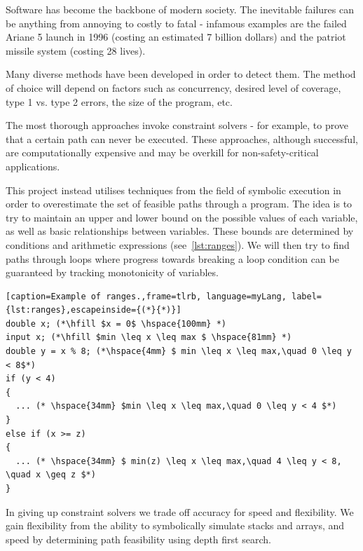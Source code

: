 \documentclass[12pt,a4paper]{article}
\begin{document}
Software has become the backbone of modern society.
The inevitable failures can be anything from annoying to costly to fatal - infamous examples are the failed Ariane 5 launch in 1996
(costing an estimated 7 billion dollars) and the patriot missile system (costing 28 lives).

Many diverse methods have been developed in order to detect them. The method of choice will depend on factors such as concurrency,
desired level of coverage, type 1 vs. type 2 errors, the size of the program, etc.

The most thorough approaches invoke constraint solvers - for example, to prove that
a certain path can never be executed. These approaches, although successful, are computationally expensive and may be overkill for non-safety-critical applications.

This project instead utilises techniques from the field of symbolic execution in order to overestimate the set of feasible paths through a program.
The idea is to try to maintain an upper and lower bound on the possible values of each variable, as well as basic relationships between variables.
These bounds are determined by conditions and arithmetic expressions (see~\cref{lst:ranges}).
We will then try to find paths through loops where progress towards breaking a loop condition can be guaranteed by tracking monotonicity of variables.

\begin{minipage}{\linewidth}
\begin{lstlisting}[caption=Example of ranges.,frame=tlrb, language=myLang, label={lst:ranges},escapeinside={(*}{*)}]
double x; (*\hfill $x = 0$ \hspace{100mm} *)
input x; (*\hfill $min \leq x \leq max $ \hspace{81mm} *)
double y = x % 8; (*\hspace{4mm} $ min \leq x \leq max,\quad 0 \leq y < 8$*)
if (y < 4)
{
  ... (* \hspace{34mm} $min \leq x \leq max,\quad 0 \leq y < 4 $*)
}
else if (x >= z)
{
  ... (* \hspace{34mm} $ min(z) \leq x \leq max,\quad 4 \leq y < 8, \quad x \geq z $*) 
}
\end{lstlisting}
\end{minipage}

In giving up constraint solvers we trade off accuracy for speed and flexibility.
We gain flexibility from the ability to symbolically simulate stacks and arrays, and speed by determining path feasibility using depth first search.
\end{document}
